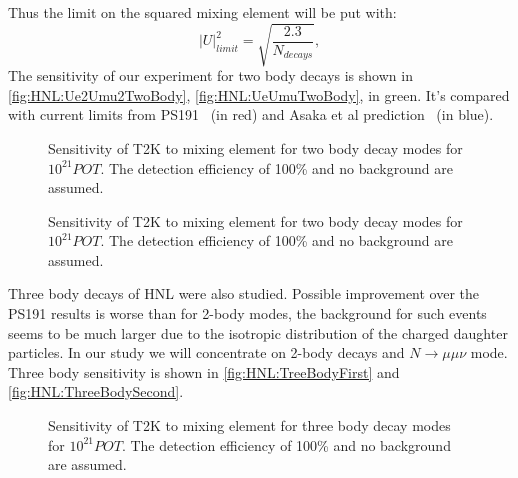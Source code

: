\documentclass[../main.tex]{subfiles}
\begin{document}
Thus the limit on the squared mixing element will be put with:
\begin{equation}
    \left|U\right|^2_{limit}=\sqrt{\frac{2.3}{N_{decays}}},
\end{equation}
The sensitivity of our experiment for two body decays is shown in \autoref{fig:HNL:Ue2Umu2TwoBody}, \autoref{fig:HNL:UeUmuTwoBody}, in green. It's compared with current limits from PS191~\cite{Bernardi1988} (in red) and Asaka et al prediction~\cite{Asaka2012} (in blue).
\begin{figure}[!ht]
    \begin{minipage}[!ht]{0.49\linewidth}
    \end{minipage}
    \hfill
    \begin{minipage}[!ht]{0.49\linewidth}
    \end{minipage}
    \caption{Sensitivity of T2K to mixing element for two body decay modes for $10^{21}POT$. The detection efficiency of 100\% and no background are assumed.}
    \label{fig:HNL:Ue2Umu2TwoBody}
\end{figure}

\begin{figure}[!ht]
    \caption{Sensitivity of T2K to mixing element for two body decay modes for $10^{21}POT$. The detection efficiency of 100\% and no background are assumed.}
    \label{fig:HNL:UeUmuTwoBody}
\end{figure}

Three body decays of HNL were also studied. Possible improvement over the PS191 results is worse than for 2-body modes, the background for such events seems to be much larger due to the isotropic distribution of the charged daughter particles. In our study we will concentrate on 2-body decays and $N\to\mu\mu\nu$ mode. Three body sensitivity is shown in \autoref{fig:HNL:TreeBodyFirst} and \autoref{fig:HNL:ThreeBodySecond}.

\begin{figure}[!ht]
    \begin{minipage}[!ht]{0.49\linewidth}
    \end{minipage}
    \hfill
    \begin{minipage}[!ht]{0.49\linewidth}
    \end{minipage}
    \caption{Sensitivity of T2K to mixing element for three body decay modes for $10^{21}POT$. The detection efficiency of 100\% and no background are assumed.}
    \label{fig:HNL:TreeBodyFirst}
\end{figure}
\end{document}
